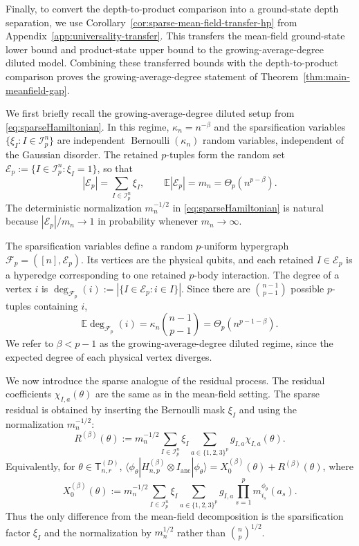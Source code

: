 \documentclass[12pt]{article}
\newcommand{\E}{\mathbb{E}}
\newcommand{\mcE}{\mathcal{E}}
\newcommand{\mcF}{\mathcal{F}}
\newcommand{\mcI}{\mathcal{I}}
\begin{document}
Finally, to convert the depth-to-product comparison into a ground-state
depth separation, we use
Corollary~\ref{cor:sparse-mean-field-transfer-hp} from
Appendix~\ref{app:universality-transfer}. This transfers the mean-field
ground-state lower bound and product-state upper bound to the
growing-average-degree diluted model. Combining these transferred bounds
with the depth-to-product comparison proves the growing-average-degree
statement of Theorem~\ref{thm:main-meanfield-gap}.


We first briefly recall the growing-average-degree diluted setup from
\eqref{eq:sparseHamiltonian}. In this regime, $\kappa_n=n^{-\beta}$ and the sparsification variables
\(\{\xi_I:I\in\mcI_p^n\}\) are independent
\(\operatorname{Bernoulli}(\kappa_n)\) random variables, independent of the
Gaussian disorder. The retained $p$-tuples form the random set $\mcE_p:=\{I\in\mcI_p^n:\xi_I=1\}$,
so that
\[
    |\mcE_p|=\sum_{I\in\mcI_p^n}\xi_I,
    \qquad
    \E |\mcE_p|=
    m_n = \Theta_p(n^{p-\beta}).
\]
The deterministic normalization \(m_n^{-1/2}\) in
\eqref{eq:sparseHamiltonian} is natural because \(|\mcE_p|/m_n\to1\) in
probability whenever \(m_n\to\infty\).

The sparsification variables define a random $p$-uniform hypergraph $\mcF_p=([n],\mcE_p)$. Its vertices are the physical qubits, and each retained
\(I\in\mcE_p\) is a hyperedge corresponding to one retained $p$-body
interaction. The degree of a vertex \(i\) is $\deg_{\mcF_p}(i)
    :=
    |\{I\in\mcE_p:i\in I\}|$. Since there are \(\binom{n-1}{p-1}\) possible $p$-tuples containing \(i\),
\[
    \E\deg_{\mcF_p}(i)
    =
    \kappa_n\binom{n-1}{p-1}
    = \Theta_p(n^{p-1-\beta}).
\]
We refer to \(\beta<p-1\) as the growing-average-degree diluted regime, since the expected
degree of each physical vertex diverges.

We now introduce the sparse analogue of the residual process. The residual
coefficients \(\chi_{I,a}(\theta)\) are the same as in the mean-field setting. The
sparse residual is obtained by inserting the Bernoulli mask \(\xi_I\) and using
the normalization \(m_n^{-1/2}\):
\[
R^{(\beta)}(\theta)
:=
m_n^{-1/2}
\sum_{I\in\mcI_p^n}
\xi_I
\sum_{a\in\{1,2,3\}^p}
g_{I,a}\chi_{I,a}(\theta).
\]
Equivalently, for \(\theta\in\mathsf{T}_{n,r}^{(D)}\), $\langle \phi_\theta|
H_{n,p}^{(\beta)}\otimes I_{\mathrm{anc}}
|\phi_\theta\rangle
=
X_0^{(\beta)}(\theta)
+
R^{(\beta)}(\theta)$, where
\[
X_0^{(\beta)}(\theta)
:=
m_n^{-1/2}
\sum_{I\in\mcI_p^n}
\xi_I
\sum_{a\in\{1,2,3\}^p}
g_{I,a}
\prod_{s=1}^p m_{i_s}^{\phi_\theta}(a_s).
\]
Thus the only difference from the mean-field decomposition is the sparsification
factor \(\xi_I\) and the normalization by \(m_n^{1/2}\) rather than
\(\binom np^{1/2}\).
\end{document}
